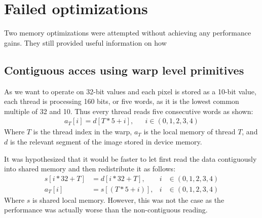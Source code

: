 \section{Failed optimizations}
Two memory optimizations were attempted without achieving any performance gains.
They still provided useful information on how

\subsection{Contiguous acces using warp level primitives} \label{sec:contuguous_access}
As we want to operate on 32-bit values and each pixel is stored as a 10-bit value, each thread is processing 160 bits, or five words, as it is the lowest common multiple of 32 and 10.
Thus every thread reads five consecutive words as shown:
\begin{align}
    a_T[i] = d[T*5+i], &  & i \in (0,1,2,3,4)
\end{align}
Where $T$ is the thread index in the warp, $a_T$ is the local memory of thread $T$, and $d$ is the relevant segment of the image stored in device memory.

It was hypothesized that it would be faster to let first read the data contiguously into shared memory and then redistribute it as follows:
\begin{align}
    s[i*32+T] & = d[i*32+T],  & i & \in (0,1,2,3,4) \\
    a_T[i]    & = s[(T*5+i)], & i & \in (0,1,2,3,4)
    \label{eq:contiguous_reading}
\end{align}
Where $s$ is shared local memory.
However, this was not the case as the performance was actually worse than the non-contiguous reading.



